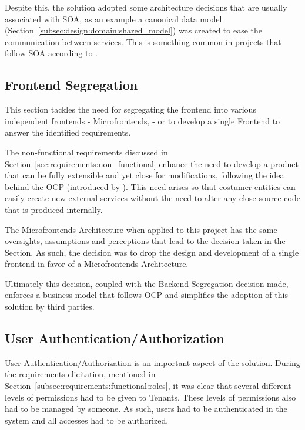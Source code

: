 Despite this, the solution adopted some architecture decisions that are usually associated with \gls{SOA}, as an example a canonical data model (Section~\ref{subsec:design:domain:shared_model}) was created to ease the communication between services. This is something common in projects that follow \gls{SOA} according to \cite{cerny2017disambiguation}.

\subsection{Frontend Segregation}
\label{subsec:design:alternatives:frontend}

This section tackles the need for segregating the frontend into various independent frontends - Microfrontends, \cite{microfrontends} - or to develop a single Frontend to answer the identified requirements.

The non-functional requirements discussed in Section~\ref{sec:requirements:non_functional} enhance the need to develop a product that can be fully extensible and yet close for modifications, following the idea behind the \gls{OCP} (introduced by \cite{martin2003agile}). This need arises so that costumer entities can easily create new external services without the need to alter any close source code that is produced internally.

The Microfrontends Architecture when applied to this project has the same oversights, assumptions and perceptions that lead to the decision taken in the  Section. As such, the decision was to drop the design and development of a single frontend in favor of a Microfrontends Architecture.

Ultimately this decision, coupled with the Backend Segregation decision made, enforces a business model that follows \gls{OCP} and simplifies the adoption of this solution by third parties.

\subsection{User Authentication/Authorization}
\label{subsec:design:alternatives:auth}

User Authentication/Authorization is an important aspect of the solution. During the requirements elicitation, mentioned in Section~\ref{subsec:requirements:functional:roles}, it was clear that several different levels of permissions had to be given to Tenants. These levels of permissions also had to be managed by someone. As such, users had to be authenticated in the system and all accesses had to be authorized.

